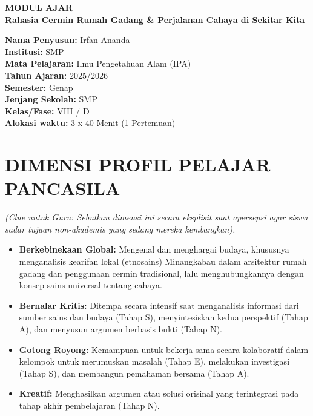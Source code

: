 \documentclass[12pt,a4paper]{article}
\begin{document}
\begin{center}
{\Huge\textbf{MODUL AJAR}}\\
\vspace{0.5cm}
{\Large\textbf{Rahasia Cermin Rumah Gadang \& Perjalanan Cahaya di Sekitar Kita}}
\end{center}

\vspace{1cm}

\begin{tcolorbox}[colback=white,colframe=black,boxrule=1pt]
\textbf{Nama Penyusun:} Irfan Ananda\\
\textbf{Institusi:} SMP\\
\textbf{Mata Pelajaran:} Ilmu Pengetahuan Alam (IPA)\\
\textbf{Tahun Ajaran:} 2025/2026\\
\textbf{Semester:} Genap\\
\textbf{Jenjang Sekolah:} SMP\\
\textbf{Kelas/Fase:} VIII / D\\
\textbf{Alokasi waktu:} 3 x 40 Menit (1 Pertemuan)
\end{tcolorbox}

\section{DIMENSI PROFIL PELAJAR PANCASILA}
\textit{(Clue untuk Guru: Sebutkan dimensi ini secara eksplisit saat apersepsi agar siswa sadar tujuan non-akademis yang sedang mereka kembangkan).}

\begin{itemize}
\item \textbf{Berkebinekaan Global:} Mengenal dan menghargai budaya, khususnya menganalisis kearifan lokal (etnosains) Minangkabau dalam arsitektur rumah gadang dan penggunaan cermin tradisional, lalu menghubungkannya dengan konsep sains universal tentang cahaya.
\item \textbf{Bernalar Kritis:} Ditempa secara intensif saat menganalisis informasi dari sumber sains dan budaya (Tahap S), menyintesiskan kedua perspektif (Tahap A), dan menyusun argumen berbasis bukti (Tahap N).
\item \textbf{Gotong Royong:} Kemampuan untuk bekerja sama secara kolaboratif dalam kelompok untuk merumuskan masalah (Tahap E), melakukan investigasi (Tahap S), dan membangun pemahaman bersama (Tahap A).
\item \textbf{Kreatif:} Menghasilkan argumen atau solusi orisinal yang terintegrasi pada tahap akhir pembelajaran (Tahap N).
\end{itemize}
\end{document}
